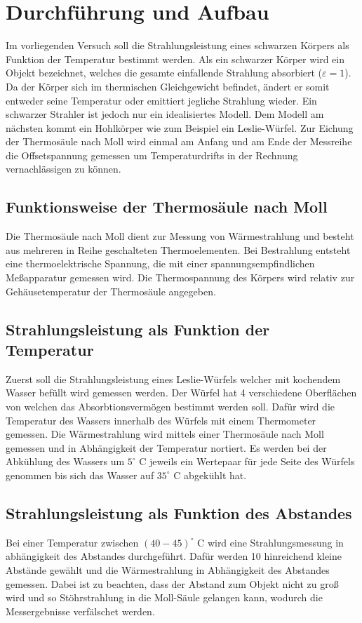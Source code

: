 \section{Durchführung und Aufbau}
\label{sec:Durchführung}
Im vorliegenden Versuch soll die Strahlungsleistung eines schwarzen Körpers als Funktion der Temperatur bestimmt werden. Als ein schwarzer Körper wird ein Objekt bezeichnet, welches die gesamte einfallende Strahlung absorbiert ($\varepsilon = 1$). Da der Körper sich im thermischen Gleichgewicht befindet, ändert er somit entweder seine Temperatur oder emittiert jegliche Strahlung wieder. Ein schwarzer Strahler ist jedoch nur ein idealisiertes Modell. Dem Modell am nächsten kommt ein Hohlkörper wie zum Beispiel ein Leslie-Würfel. Zur Eichung der Thermosäule nach Moll wird einmal am Anfang und am Ende der Messreihe die Offsetspannung gemessen um Temperaturdrifts in der Rechnung vernachlässigen zu können.
\subsection{Funktionsweise der Thermosäule nach Moll}
Die Thermosäule nach Moll dient zur Messung von Wärmestrahlung und besteht aus mehreren in Reihe geschalteten Thermoelementen. Bei Bestrahlung entsteht eine thermoelektrische Spannung, die mit einer spannungsempfindlichen Meßapparatur gemessen wird. Die Thermospannung des Körpers wird relativ zur Gehäusetemperatur der Thermosäule angegeben.
\subsection{Strahlungsleistung als Funktion der Temperatur}
Zuerst soll die Strahlungsleistung eines Leslie-Würfels welcher mit kochendem Wasser befüllt wird gemessen werden. Der Würfel hat 4 verschiedene Oberflächen von welchen das Absorbtionsvermögen bestimmt werden soll. Dafür wird die Temperatur des Wassers innerhalb des Würfels mit einem Thermometer gemessen. Die Wärmestrahlung wird mittels einer Thermosäule nach Moll gemessen und in Abhängigkeit der Temperatur nortiert. Es werden bei der Abkühlung des Wassers um $5^\circ$ C jeweils ein Wertepaar für jede Seite des Würfels genommen bis sich das Wasser auf $35^\circ$ C abgekühlt hat.
\subsection{Strahlungsleistung als Funktion des Abstandes}
Bei einer Temperatur zwischen $(40 - 45) ^\circ$ C wird eine Strahlungsmessung in abhängigkeit des Abstandes durchgeführt. Dafür werden 10 hinreichend kleine Abstände gewählt und die Wärmestrahlung in Abhängigkeit des Abstandes gemessen. Dabei ist zu beachten, dass der Abstand zum Objekt nicht zu groß wird und so Stöhrstrahlung in die Moll-Säule gelangen kann, wodurch die Messergebnisse verfälschet werden.
